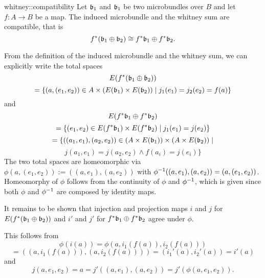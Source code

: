 \begin{mylemma}{whitney::compatibility}{}
    Let $\mathfrak{b}_1$ and $\mathfrak{b}_1$ be two microbundles over $B$ and let $f: A \to B$ be a map.
    The induced microbundle and the whitney sum are compatible, that is
    \[ f^*(\mathfrak{b}_1 \oplus{} \mathfrak{b}_2) \cong f^*\mathfrak{b}_1 \oplus{} f^*\mathfrak{b}_2. \]
\end{mylemma}

\begin{myproof}
    From the definition of the induced microbundle and the whitney sum, we can explicitly write the total spaces
    \[ E(f^*(\mathfrak{b}_1 \oplus{} \mathfrak{b}_2)) \]
    \[ = \{(a, (e_1, e_2)) \in A \times (E(\mathfrak{b}_1) \times E(\mathfrak{b}_2)) \mid j_1(e_1) = j_2(e_2) = f(a) \} \]
    and
    \[ E(f^*\mathfrak{b}_1 \oplus{} f^*\mathfrak{b}_2) \]
    \[ = \{(e_1, e_2) \in E(f^*\mathfrak{b}_1) \times E(f^*\mathfrak{b}_2) \mid j_1(e_1) = j(e_2)\}\]
    \[ = \{((a_1, e_1), (a_2, e_2)) \in (A \times E(\mathfrak{b}_1)) \times (A \times E(\mathfrak{b}_2)) \mid \]
    \[ j(a_1, e_1) = j(a_2, e_2) \land f(a_i) = j(e_i)\} \]
    The two total spaces are homeomorphic via $\phi(a, (e_1, e_2)) := ((a, e_1), (a, e_2))$ with $\phi^{-1}((a, e_1), (a, e_2)) = (a, (e_1, e_2))$.
    Homeomorphy of $\phi$ follows from the continuity of $\phi$ and $\phi^{-1}$, which is given since both $\phi$ and $\phi^{-1}$ are composed by identity maps.
    
    It remains to be shown that injection and projection maps $i$ and $j$ for $E(f^*(\mathfrak{b}_1 \oplus{} \mathfrak{b}_2))$
    and $i'$ and $j'$ for $f^*\mathfrak{b}_1 \oplus{} f^*\mathfrak{b}_2$ agree under $\phi$.

    This follows from
    \[ \phi(i(a)) = \phi(a, i_1(f(a)), i_2(f(a))) \]
    \[ = ((a, i_1(f(a))), (a, i_2(f(a)))) = (i_1'(a), i_2'(a)) = i'(a) \]
    and
    \[ j(a, e_1, e_2) = a = j'((a, e_1), (a, e_2)) = j'(\phi(a, e_1, e_2)). \]
\end{myproof}